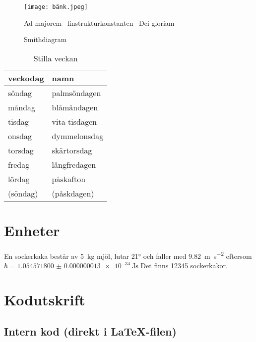\documentclass[a4paper, article, oneside, leqno]{memoir}
\begin{document}
\begin{figure}[ht]
  \centering
  \texttt{[image: bänk.jpeg]}
  \caption{Ad majorem\,--\,finstrukturkonstanten\,--\,Dei gloriam}
  \label{fig:bänk}
\end{figure}

\begin{figure}[ht]
  \centering
  
  \caption{Smithdiagram}
  \label{fig:smith}
\end{figure}

\begin{table}[ht]  
  \centering
  \begin{tabular}{ll}
    \toprule
    veckodag & namn \\
    \midrule
    söndag & palmsöndagen \\
    måndag & blåmåndagen \\
    tisdag & vita tisdagen \\
    onsdag & dymmelonsdag \\
    torsdag & skärtorsdag \\
    fredag & långfredagen \\
    lördag & påskafton \\
    (söndag) & (påskdagen) \\
    \bottomrule
  \end{tabular}
  \caption{Stilla veckan}
  \label{tab:stilla}
\end{table}

\chapter{Enheter}


En sockerkaka består av \SI{5}{\kilo\gram} mjöl, lutar \ang{21} och faller med \SI{9,82}{\meter\per\second^2} eftersom \(\hbar = \SI{1.054571800(13)e-34}{\joule\second}\) Det finns \num{12345} sockerkakor.

\appendix
\chapter{Kodutskrift}


\section{Intern kod (direkt i LaTeX-filen)}
\end{document}
